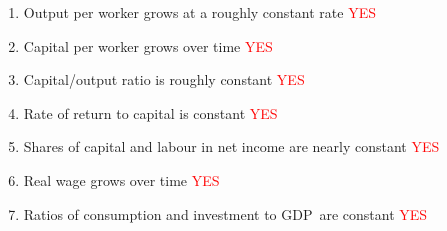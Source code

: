 \documentclass[notes=show]{beamer}
\begin{document}
\begin{frame}%


\begin{enumerate}
\item Output per worker grows at a roughly constant rate 
\textcolor{red}{YES}%

\item Capital per worker grows over time 
\textcolor{red}{YES}%

\item Capital/output ratio is roughly constant 
\textcolor{red}{YES}%

\item Rate of return to capital is constant 
\textcolor{red}{YES}%

\item Shares of capital and labour in net income are nearly constant 
\textcolor{red}{YES}%

\item Real wage grows over time 
\textcolor{red}{YES}%

\item Ratios of consumption and investment to GDP\ are constant 
\textcolor{red}{YES}%
\end{enumerate}

\transboxout%
\end{frame}%
\end{document}
